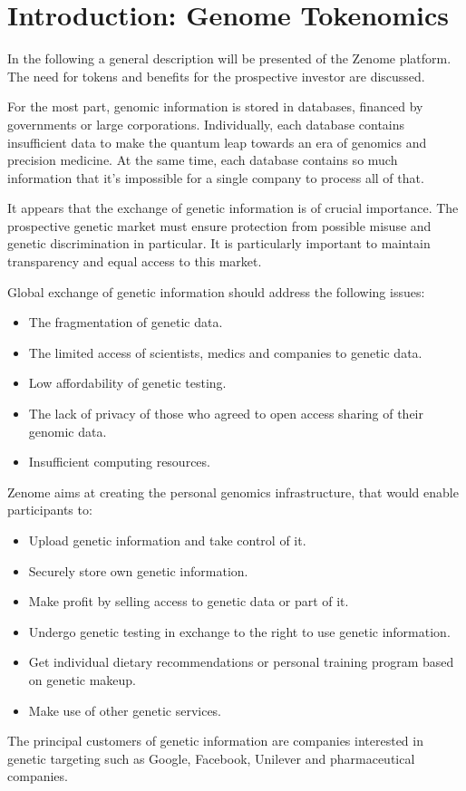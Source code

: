 \chapter*{Introduction: Genome Tokenomics}

\begin{overview}
  In the following a general description will be presented of the Zenome platform. The need for tokens and benefits for the prospective investor are discussed.
\end{overview}

For the most part, genomic information is stored in databases, financed by governments or large corporations. Individually, each database contains  insufficient data to make the quantum leap towards an era of genomics and precision medicine. At the same time, each database contains so much information that it's impossible for a single company to process all of that.

It appears that the exchange of genetic information is of crucial importance. The prospective genetic market must ensure protection from possible misuse and genetic discrimination in particular. It is particularly important to maintain transparency and equal access to this market.

Global exchange of genetic information should address the following issues:
\begin{itemize}
  \item The fragmentation of genetic data.
	\item The limited access of scientists, medics and companies to genetic data.
	\item Low affordability of genetic testing.
	\item The lack of privacy of those who agreed to open access sharing of their genomic data.
	\item Insufficient computing resources.
\end{itemize}

Zenome aims at creating the personal genomics infrastructure, that would enable participants to:
\begin{itemize}
  \item Upload genetic information and take control of it.
	\item Securely store own genetic information.
	\item Make profit by selling access to genetic data or part of it.
	\item Undergo genetic testing in exchange to the right to use genetic information.
	\item Get individual dietary recommendations or personal training program based on genetic makeup.
	\item Make use of other genetic services.
\end{itemize}
The principal customers of genetic information are companies interested in genetic targeting such as Google, Facebook, Unilever and pharmaceutical companies.

